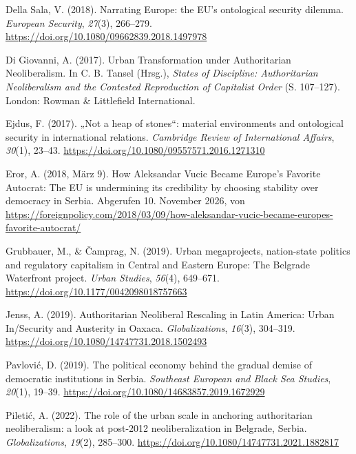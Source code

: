 \documentclass[
  ngerman,
]{agujournal2019}
\newlength{\cslhangindent}
\newenvironment{CSLReferences}[2] %
 {\begin{list}{}{%
  \setlength{\itemindent}{0pt}
  \setlength{\leftmargin}{0pt}
  \setlength{\parsep}{0pt}
  \ifodd #1
   \setlength{\leftmargin}{\cslhangindent}
   \setlength{\itemindent}{-1\cslhangindent}
  \fi
  \setlength{\itemsep}{#2\baselineskip}}}
 {\end{list}}
\begin{document}
\begin{CSLReferences}{1}{0}
Della Sala, V. (2018). Narrating Europe: the EU's ontological security
dilemma. \emph{European Security}, \emph{27}(3), 266--279.
\url{https://doi.org/10.1080/09662839.2018.1497978}

Di Giovanni, A. (2017). Urban Transformation under Authoritarian
Neoliberalism. In C. B. Tansel (Hrsg.), \emph{States of Discipline:
Authoritarian Neoliberalism and the Contested Reproduction of Capitalist
Order} (S. 107--127). London: Rowman \& Littlefield International.

Ejdus, F. (2017). {„Not a heap of stones``}: material environments and
ontological security in international relations. \emph{Cambridge Review
of International Affairs}, \emph{30}(1), 23--43.
\url{https://doi.org/10.1080/09557571.2016.1271310}

Eror, A. (2018, März 9). How {Aleksandar} {Vucic} Became {Europe}'s
Favorite Autocrat: The {EU} is undermining its credibility by choosing
stability over democracy in {Serbia}. Abgerufen 10. November 2026, von
\url{https://foreignpolicy.com/2018/03/09/how-aleksandar-vucic-became-europes-favorite-autocrat/}

Grubbauer, M., \& Čamprag, N. (2019). Urban megaprojects, nation-state
politics and regulatory capitalism in {Central} and {Eastern} {Europe}:
The {Belgrade} {Waterfront} project. \emph{Urban Studies}, \emph{56}(4),
649--671. \url{https://doi.org/10.1177/0042098018757663}

Jenss, A. (2019). Authoritarian Neoliberal Rescaling in {L}atin
{A}merica: Urban In/Security and Austerity in {O}axaca.
\emph{Globalizations}, \emph{16}(3), 304--319.
\url{https://doi.org/10.1080/14747731.2018.1502493}

Pavlović, D. (2019). The political economy behind the gradual demise of
democratic institutions in Serbia. \emph{Southeast European and Black
Sea Studies}, \emph{20}(1), 19--39.
\url{https://doi.org/10.1080/14683857.2019.1672929}

Piletić, A. (2022). The role of the urban scale in anchoring
authoritarian neoliberalism: a look at post-2012 neoliberalization in
{Belgrade}, {Serbia}. \emph{Globalizations}, \emph{19}(2), 285--300.
\url{https://doi.org/10.1080/14747731.2021.1882817}


\end{CSLReferences}
\end{document}
